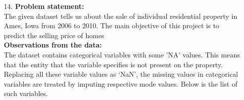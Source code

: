 \documentclass[12pt]{article}
\begin{document}
\begin{enumerate}
(b) E(X) = $ \int^{+\infty}_{-\infty} x.f(x) \, dx $ \\
$=$ $ \int^{0}_{-\infty} x.f(x) \, dx + $
$ \int^{1}_{0} x.f(x) \, dx +  \int^{+\infty}_{1} x.f(x) \, dx $ \\
$ = 0 +  \int^{1}_{0} x.f(x) \, dx + 0 $ \\
$ = \int^{1}_{0} x.x^ {-1/2}/2  \, dx $ \\
$ = \int^{1}_{0} x^ {1/2}/2  \, dx $ \\
$ = x^{3/2}/3$ \\
$ = (1^{3/2}-0^{3/2})/3$ \\
$ = 1/3$ \\


(c) Var(x) = $ \int^{+\infty}_{-\infty} (x-u)^2.f(x) \, dx $ \\
$=$ $ \int^{0}_{-\infty} (x-u)^2.f(x) \, dx + $
$ \int^{1}_{0} (x-u)^2.f(x) \, dx +  \int^{+\infty}_{1} (x-u)^2.f(x) \, dx $ \\
$ = 0 +  \int^{1}_{0} (x-u)^2.f(x) \, dx + 0 $ \\
$ = 0 +  \int^{1}_{0} (x-u)^2.x^{-1/2}/2 \, dx + 0 $ \\
$ = 0 +  \int^{1}_{0} (x-1/3)^2.x^{-1/2}/2 \, dx + 0 $ \\
$ = (1/2)\int^{1}_{0} (x^2-2x/3+1/9).x^{-1/2}/2 \, dx $ \\
$ = (1/2)\int^{1}_{0} (x^{3/2}-2x^{1/2}/3+(1/9)x^{-1/2}) \, dx $ \\
$ = (1/2)(2x^{5/2}/5-4x^{3/2}/9+2x^{1/2}/9)$ \\
$ = (1/2)((2/5)1^{5/2}-(4/9)1^{3/2}+(2/9)1^{1/2})$ \\
$ = (1/2)(8/45)$ \\
$ = 4/45$ \\

\item [14.] \textbf{Problem statement:} \\

The given dataset tells us about the sale of individual residential property in Ames, Iowa from 2006 to 2010. The main objective of this project is to predict the selling price of homes \\

\textbf{Observations from the data:} \\

The dataset contains categorical variables with some 'NA' values. This means that the entity that the variable specifies is not present on the property. Replacing all these variable values as ‘NaN’, the missing values in categorical variables are treated by imputing respective mode values. Below is the list of such variables. \\


\end{enumerate}
\end{document}
